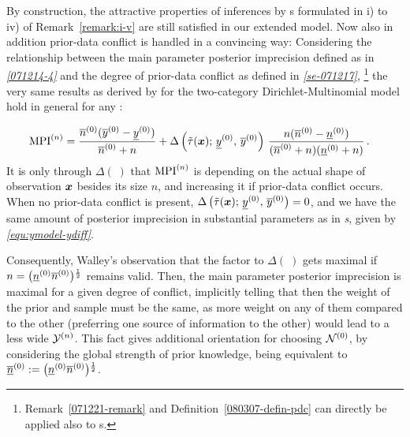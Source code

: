 \begin{remark}\label{remark8}
By construction, the attractive properties of inferences by
\ymodel s formulated in i) to iv) of Remark~\ref{remark:i-v}
are still satisfied in our extended model. Now
also in addition prior-data conflict is handled in a
convincing way: Considering the relationship between the main
parameter posterior imprecision defined as in
\emph{\eqref{071214-4}} and the degree of prior-data conflict
as defined in \emph{\eqref{se-071217}},%
\footnote{Remark~\ref{071221-remark} and Definition~\ref{080307-defin-pdc} can directly be applied also to \nymodel s.}
the very same results as derived by \textcite[p.~224]{1991:walley}
for the two-category Dirichlet-Multinomial model hold in general
for any \nymodel: %

\begin{align*}
{\rm MPI}\un &= \frac{\nzu (\yzu - \yzl)}{\nzu + n}
                + \Delta \left(\ttau(\x);\, \yzl,\,\yzu\right)
                  \, \frac{n (\nzu - \nzl)}{(\nzu + n)(\nzl + n)}\,.%
\end{align*}
It is only through $\Delta(\;)$ that ${\rm MPI}^{(n)}$ is 
depending on the actual shape of observation ${\bm x}$ besides its size
$n$, and increasing it if prior-data conflict occurs. When no
prior-data conflict is present, $\Delta \left(\tilde{\tau}({\bm x});\,\underline{y}^{(0)},\,\overline{y}^{(0)}\right) = 0$,
and we have the same amount of posterior imprecision in substantial parameters as in \emph{\ymodel s},
given by \emph{\eqref{equ:ymodel-ydiff}}.

Consequently, Walley's \parencite*[\S 5.4, footnote~3]{1991:walley} observation
that the factor to $\Delta(\;)$ gets maximal if $n = \big(\underline{n}^{(0)}\overline{n}^{(0)}\big){}^\frac{1}{2}$
remains valid. Then, the main parameter posterior imprecision
is maximal for a given degree of conflict, implicitly telling that
then the weight of the prior and sample must be the same, as more
weight on any of them compared to the other (preferring one source
of information to the other) would lead to a less wide $\mathcal{Y}^{(n)}$.
This fact gives additional orientation for choosing $\mathcal{N}^{(0)}$,
by considering the global strength of prior knowledge,
being equivalent to $\underline{\overline{n}}^{(0)} := \big(\underline{n}^{(0)}\overline{n}^{(0)}\big){}^\frac{1}{2}$.
\end{remark}

